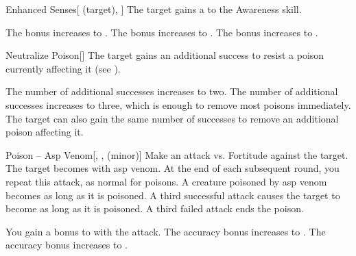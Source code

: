 \lowercase{\hypertarget{spell:Enhanced Senses}{}}\label{spell:Enhanced Senses}
\begin{attuneability}[Rank 1]{\hypertarget{spell:Enhanced Senses}{Enhanced Senses}}[ (target), ]
The target gains a   to the Awareness skill.

\rankline
{} The bonus increases to .
 The bonus increases to .
 The bonus increases to .
\end{attuneability}
\vspace{0.25em}



\lowercase{\hypertarget{spell:Neutralize Poison}{}}\label{spell:Neutralize Poison}
\begin{freeability}[Rank 1]{\hypertarget{spell:Neutralize Poison}{Neutralize Poison}}[]
The target gains an additional success to resist a poison currently affecting it (see ).

\rankline
{} The number of additional successes increases to two.
 The number of additional successes increases to three, which is enough to remove most poisons immediately.
 The target can also gain the same number of successes to remove an additional poison affecting it.
\end{freeability}
\vspace{0.25em}



\lowercase{\hypertarget{spell:Poison -- Asp Venom}{}}\label{spell:Poison -- Asp Venom}
\begin{freeability}[Rank 1]{\hypertarget{spell:Poison -- Asp Venom}{Poison -- Asp Venom}}[, ,  (minor)]
Make an attack vs. Fortitude against the target.
\hit The target becomes  with asp venom.
At the end of each subsequent round, you repeat this attack, as normal for poisons.
A creature poisoned by asp venom becomes  as long as it is poisoned.
A third successful attack causes the target to become  as long as it is poisoned.
A third failed attack ends the poison.

\rankline
{} You gain a  bonus to  with the attack.
 The accuracy bonus increases to .
 The accuracy bonus increases to .
\end{freeability}
\vspace{0.25em}




